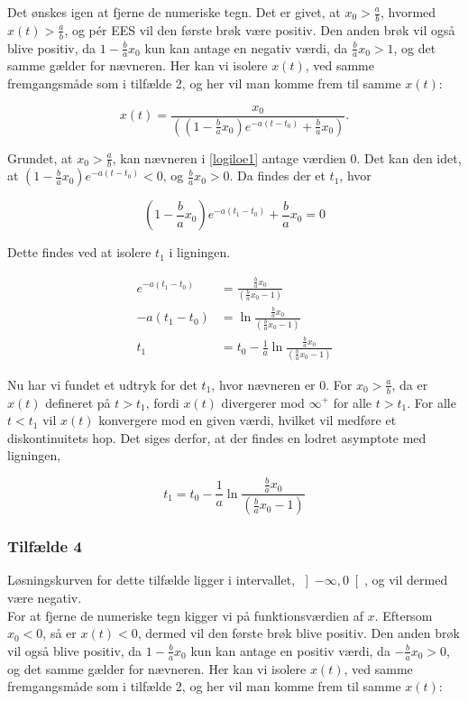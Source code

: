 Det ønskes igen at fjerne de numeriske tegn. Det er givet, at $x_0 > \frac{a}{b}$, hvormed $x(t) > \frac{a}{b}$, og pér EES vil den første brøk være positiv. Den anden brøk vil også blive positiv, da $1-\frac{b}{a}x_0$ kun kan antage en negativ værdi, da $\frac{b}{a}x_0>1$, og det samme gælder for nævneren. Her kan vi isolere $x(t)$, ved samme fremgangsmåde som i tilfælde 2, og her vil man komme frem til samme $x(t)$:

\begin{equation}\label{logiloe1}
    x(t)= \frac{x_0}{ \left( \left(1- \frac{b}{a}x_0 \right)e^{-a(t-t_0)}+ \frac{b}{a}x_0 \right)}.
\end{equation}

Grundet, at $x_0>\frac{a}{b}$, kan nævneren i \eqref{logiloe1} antage værdien $0$. Det kan den idet, at $(1-\frac{b}{a}x_0)e^{-a(t-t_0)}<0$, og $\frac{b}{a}x_0>0$. Da findes der et $t_1$, hvor 

$$ \left(1- \frac{b}{a}x_0 \right)e^{-a(t_1-t_0)}+ \frac{b}{a}x_0 =0$$

Dette findes ved at isolere $t_1$ i ligningen. 

\begin{align*}
    e^{-a(t_1-t_0)}&=\frac{\frac{b}{a}x_0}{\left( \frac{b}{a}x_0 - 1 \right)}\\
    -a(t_1-t_0)&= \ln \frac{\frac{b}{a}x_0}{\left( \frac{b}{a}x_0 - 1 \right)}\\
    t_1&=t_0-\frac{1}{a}\ln\frac{\frac{b}{a}x_0}{\left(\frac{b}{a}x_0 - 1 \right)}
\end{align*}

Nu har vi fundet et udtryk for det $t_1$, hvor nævneren er $0$. For $x_0>\frac{a}{b}$, da er $x(t)$ defineret på $t>t_1$, fordi $x(t)$ divergerer mod $\infty^+$ for alle $t>t_1$. For alle $t<t_1$ vil $x(t)$ konvergere mod en given værdi, hvilket vil medføre et diskontinuitets hop. Det siges derfor, at der findes en lodret asymptote med ligningen,

\begin{equation*}
    t_1=t_0-\frac{1}{a}\ln\frac{\frac{b}{a}x_0}{\left(\frac{b}{a}x_0 - 1 \right)}
\end{equation*}


\subsubsection{Tilfælde 4}
Løsningskurven for dette tilfælde ligger i intervallet, $\left]- \infty , 0 \right[$, og vil dermed være negativ.\\
\hfill \break
For at fjerne de numeriske tegn kigger vi på funktionsværdien af $x$. Eftersom $x_0<0$, så er $x(t)<0$, dermed vil den første brøk blive positiv. Den anden brøk vil også blive positiv, da $1-\frac{b}{a}x_0$ kun kan antage en positiv værdi, da $-\frac{b}{a}x_0>0$, og det samme gælder for nævneren. Her kan vi isolere $x(t)$, ved samme fremgangsmåde som i tilfælde 2, og her vil man komme frem til samme $x(t)$:

